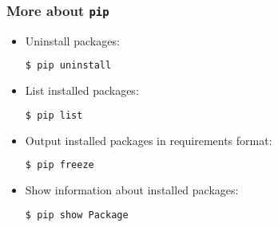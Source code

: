 \begin{frame}[t, fragile]
\frametitle{More about \texttt{pip}}




\begin{itemize}
\item<1-> Uninstall packages:                   
\begin{lstlisting}[language=bash]
$ pip uninstall
\end{lstlisting}
\item<2->List installed packages:
\begin{lstlisting}[language=bash]
$ pip list
\end{lstlisting}
\item<3-> Output installed packages in requirements format:
\begin{lstlisting}[language=bash]
$ pip freeze
\end{lstlisting}
\item<4-> Show information about installed packages:
\begin{lstlisting}[language=bash]
$ pip show Package
\end{lstlisting}
\end{itemize}

\end{frame}

%
%
%

